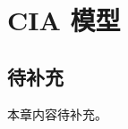 

\ChapterGeometry

\chapter{CIA 模型}\label{ch:07}

\section{待补充}\label{sec:chap07-todo}

本章内容待补充。


\SymmetricGeometry
